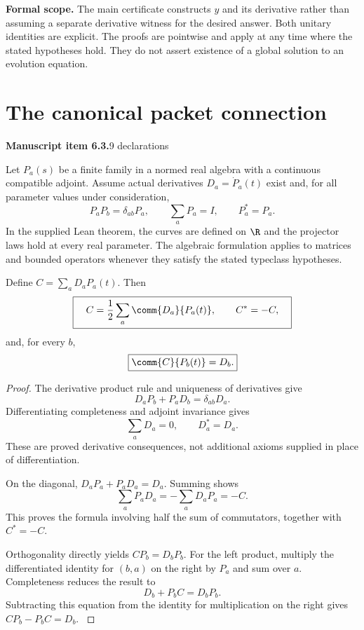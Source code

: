 \textbf{Formal scope.} The main certificate constructs $y$ and its derivative rather than assuming a separate derivative witness for the desired answer. Both unitary identities are explicit. The proofs are pointwise and apply at any time where the stated hypotheses hold. They do not assert existence of a global solution to an evolution equation.





\section{The canonical packet connection}\label{supp2:section:004}
\textbf{Manuscript item 6.3.}\quad {}\hfill 9 declarations

Let $P_a(s)$ be a finite family in a normed real algebra with a continuous compatible adjoint. Assume actual derivatives $D_a=\dot P_a(t)$ exist and, for all parameter values under consideration,
\[
 P_aP_b=\delta_{ab}P_a,\qquad \sum_aP_a=I,\qquad P_a^*=P_a.
\]
In the supplied Lean theorem, the curves are defined on $\R$ and the projector laws hold at every real parameter. The algebraic formulation applies to matrices and bounded operators whenever they satisfy the stated typeclass hypotheses.

\begin{statement}\label{supp2:statement:004}
Define $C=\sum_aD_aP_a(t)$. Then
\[
 \boxed{\quad C=\frac12\sum_a\comm{D_a}{P_a(t)},\qquad C^*=-C,\quad}
\]
and, for every $b$,
\[
 \boxed{\comm{C}{P_b(t)}=D_b.}
\]
\end{statement}

\begin{proof}\label{supp2:proof:004}
The derivative product rule and uniqueness of derivatives give
\[
 D_aP_b+P_aD_b=\delta_{ab}D_a.
\]
Differentiating completeness and adjoint invariance gives
\[
 \sum_aD_a=0,\qquad D_a^*=D_a.
\]
These are proved derivative consequences, not additional axioms supplied in place of differentiation.

On the diagonal, $D_aP_a+P_aD_a=D_a$. Summing shows
\[
 \sum_aP_aD_a=-\sum_aD_aP_a=-C.
\]
This proves the formula involving half the sum of commutators, together with $C^*=-C$.

Orthogonality directly yields $CP_b=D_bP_b$. For the left product, multiply the differentiated identity for $(b,a)$ on the right by $P_a$ and sum over $a$. Completeness reduces the result to
\[
 D_b+P_bC=D_bP_b.
\]
Subtracting this equation from the identity for multiplication on the right gives $CP_b-P_bC=D_b$.
\label{supp2:proof:004:end}\end{proof}

